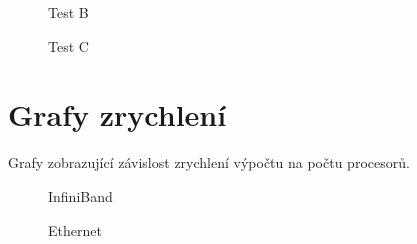 \documentclass[12pt]{article}
\begin{document}
\begin{figure}[H]
\begin{center}
\caption{Test B}
\label{fig:testBether}
\end{center}
\end{figure}

\begin{figure}[H]
\begin{center}
\caption{Test C}
\label{fig:testCether}
\end{center}
\end{figure}

\section{Grafy zrychlení}
Grafy zobrazující závislost zrychlení výpočtu na počtu procesorů.
\begin{figure}[H]
\begin{center}
\label{fig:zrychleniinf}
\caption{InfiniBand}
\end{center}
\end{figure}

\begin{figure}[H]
\begin{center}
\label{fig:zrychlenieth}
\caption{Ethernet}
\end{center}
\end{figure}
\end{document}
